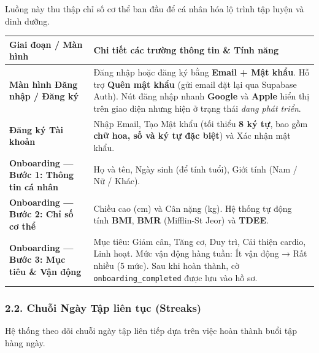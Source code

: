 \documentclass[12pt,a4paper]{article}
\newcounter{none}
\begin{document}
Luồng này thu thập chỉ số cơ thể ban đầu để cá nhân hóa lộ trình tập
luyện và dinh dưỡng.

{\def\LTcaptype{none} %
\begin{longtable}[]{@{}
  >{\raggedright\arraybackslash}p{}
  >{\raggedright\arraybackslash}p{}@{}}
\toprule\noalign{}
\begin{minipage}[b]{\linewidth}\raggedright
Giai đoạn / Màn hình
\end{minipage} & \begin{minipage}[b]{\linewidth}\raggedright
Chi tiết các trường thông tin \& Tính năng
\end{minipage} \\
\midrule\noalign{}
\endhead
\bottomrule\noalign{}
\endlastfoot
\textbf{Màn hình Đăng nhập / Đăng ký} & Đăng nhập hoặc đăng ký bằng
\textbf{Email + Mật khẩu}. Hỗ trợ \textbf{Quên mật khẩu} (gửi email đặt
lại qua Supabase Auth). Nút đăng nhập nhanh \textbf{Google} và
\textbf{Apple} hiển thị trên giao diện nhưng hiện ở trạng thái
\emph{đang phát triển}. \\
\textbf{Đăng ký Tài khoản} & Nhập Email, Tạo Mật khẩu (tối thiểu
\textbf{8 ký tự}, bao gồm \textbf{chữ hoa, số và ký tự đặc biệt}) và Xác
nhận mật khẩu. \\
\textbf{Onboarding --- Bước 1: Thông tin cá nhân} & Họ và tên, Ngày sinh
(để tính tuổi), Giới tính (Nam / Nữ / Khác). \\
\textbf{Onboarding --- Bước 2: Chỉ số cơ thể} & Chiều cao (cm) và Cân
nặng (kg). Hệ thống tự động tính \textbf{BMI}, \textbf{BMR} (Mifflin-St
Jeor) và \textbf{TDEE}. \\
\textbf{Onboarding --- Bước 3: Mục tiêu \& Vận động} & Mục tiêu: Giảm
cân, Tăng cơ, Duy trì, Cải thiện cardio, Linh hoạt. Mức vận động hàng
tuần: Ít vận động → Rất nhiều (5 mức). Sau khi hoàn thành, cờ
\texttt{onboarding\_completed} được lưu vào hồ sơ. \\
\end{longtable}
}

\subsubsection{2.2. Chuỗi Ngày Tập liên tục
(Streaks)}\label{chuux1ed7i-nguxe0y-tux1eadp-liuxean-tux1ee5c-streaks}

Hệ thống theo dõi chuỗi ngày tập liên tiếp dựa trên việc hoàn thành buổi
tập hàng ngày.
\end{document}
